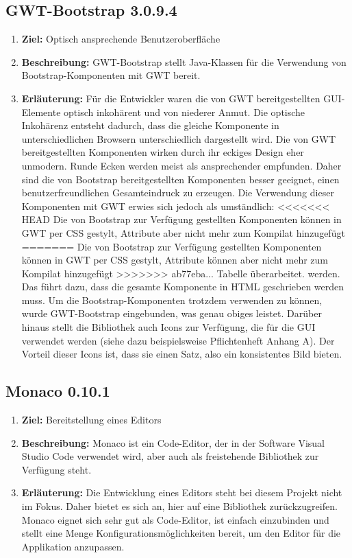 \documentclass[parskip=full,11pt]{scrartcl}
\begin{document}
\subsection{GWT-Bootstrap 3.0.9.4}
\begin{enumerate}
\item[] \textbf{Ziel:} Optisch ansprechende Benutzeroberfläche
\item[] \textbf{Beschreibung:} GWT-Bootstrap stellt Java-Klassen für die Verwendung von Bootstrap-Komponenten mit GWT bereit.
\item[] \textbf{Erläuterung:} Für die Entwickler waren die von GWT bereitgestellten GUI-Elemente optisch inkohärent und von niederer Anmut.
Die optische Inkohärenz entsteht dadurch, dass die gleiche Komponente in unterschiedlichen Browsern unterschiedlich dargestellt wird.
Die von GWT bereitgestellten Komponenten wirken durch ihr eckiges Design eher unmodern.
Runde Ecken werden meist als ansprechender empfunden.
Daher sind die von Bootstrap bereitgestellten Komponenten besser geeignet, einen benutzerfreundlichen Gesamteindruck zu erzeugen.
Die Verwendung dieser Komponenten mit GWT erwies sich jedoch als umständlich:
<<<<<<< HEAD
Die von Bootstrap zur Verfügung gestellten Komponenten können in GWT per CSS gestylt, Attribute aber nicht mehr zum Kompilat hinzugefügt
=======
Die von Bootstrap zur Verfügung gestellten Komponenten können in GWT per CSS gestylt, Attribute können aber nicht mehr zum Kompilat hinzugefügt
>>>>>>> ab77eba... Tabelle überarbeitet.
werden. Das führt dazu, dass die gesamte Komponente in HTML geschrieben werden muss.
Um die Bootstrap-Komponenten trotzdem verwenden zu können, wurde GWT-Bootstrap eingebunden, was genau obiges leistet.
Darüber hinaus stellt die Bibliothek auch Icons zur Verfügung, die für die GUI verwendet werden (siehe dazu beispielsweise Pflichtenheft Anhang A).
Der Vorteil dieser Icons ist, dass sie einen Satz, also ein konsistentes Bild bieten.
\end{enumerate}

\subsection{Monaco 0.10.1}
\begin{enumerate}
\item[] \textbf{Ziel:} Bereitstellung eines Editors
\item[] \textbf{Beschreibung:} Monaco ist ein Code-Editor, der in der Software Visual Studio Code verwendet wird, aber auch als freistehende
Bibliothek zur Verfügung steht.
\item[] \textbf{Erläuterung:} Die Entwicklung eines Editors steht bei diesem Projekt nicht im Fokus.  Daher bietet es sich an, hier auf eine Bibliothek zurückzugreifen.
Monaco eignet sich sehr gut als Code-Editor, ist einfach einzubinden und stellt
 eine Menge Konfigurationsmöglichkeiten bereit, um den Editor für die Applikation anzupassen.
\end{enumerate}
\end{document}
